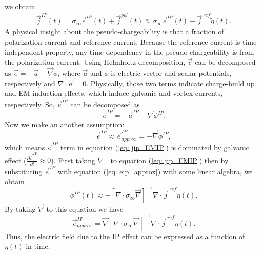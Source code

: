 \documentclass[a4paper, 11pt]{article}
\renewcommand{\div}{\nabla\cdot}
\newcommand{\grad}{\vec \nabla}
\newcommand{\siginf}{\sigma_\infty}
\renewcommand {\j}  { {\vec j} }
\renewcommand {\b}  { {\vec b} }
\newcommand {\e}  { {\vec e} }
\newcommand{\peta}{\tilde{\eta}}
\begin{document}
we obtain
\begin{eqnarray}
  \j^{IP}(t) = \siginf\e^{IP}(t) + \j^{pol}(t) \approx \siginf\e^{IP}(t) -\j^{\ ref}\peta(t).
  \label{eq: jip_EMIP}
\end{eqnarray}
A physical insight about the pseudo-chargeability is that a fraction of polarization current and reference current. Because the reference current is time-independent property, any time-dependency in the pseudo-chargeability is from the polarization current. Using Helmholtz decomposition, $\e$ can be decomposed as $\e=-\vec{a}-\grad\phi$, where $\vec{a}$ and $\phi$ is electric vector and scalar potentials, respectively and $\div\vec{a}=0$. Physically, those two terms indicate charge-build up and EM induction effects, which induce galvanic and vortex currents, respectively. So, $\e^{IP}$ can be decomposed as
\begin{equation}
  \e^{IP}=-\vec{a}^{IP}-\grad\phi^{IP}.
\end{equation}
Now we make an another assumption:
\begin{equation}
  \e^{IP} \approx  \e^{IP}_{approx} = -\grad\phi^{IP},
  \label{eq: eip_approx}
\end{equation}
which means $\e^{IP}$ term in equation (\ref{eq: jip_EMIP}) is dominated by galvanic effect ($\frac{\partial\b^{IP}}{\partial t}\approx 0$). First taking $\div$ to equation (\ref{eq: jip_EMIP}) then by substituting  $\e^{IP}$ with equation (\ref{eq: eip_approx}) with some linear algebra, we obtain
\begin{equation}
  \phi^{IP}(t) \approx -[\div \siginf\grad]^{-1}\div\j^{\ ref}\peta(t).
  \label{eq: phiIPapprox_general}
\end{equation}
By taking $\grad$ to this equation we have
\begin{equation}
    \e^{IP}_{approx} = \grad[\div \siginf\grad]^{-1}\div\j^{\ ref}\peta(t).
    \label{eq: eip_approx_full}
\end{equation}
Thus, the electric field due to the IP effect can be expressed as a function of $\peta(t)$ in time.
\end{document}
